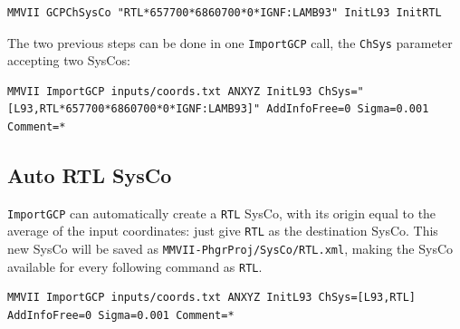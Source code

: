\begin{lstlisting}
MMVII GCPChSysCo "RTL*657700*6860700*0*IGNF:LAMB93" InitL93 InitRTL
\end{lstlisting}


The two previous steps can be done in one \texttt{ImportGCP} call, the \texttt{ChSys} parameter accepting two
SysCos:

\begin{lstlisting}
MMVII ImportGCP inputs/coords.txt ANXYZ InitL93 ChSys="[L93,RTL*657700*6860700*0*IGNF:LAMB93]" AddInfoFree=0 Sigma=0.001 Comment=*
\end{lstlisting}

\subsection{Auto RTL SysCo}

\texttt{ImportGCP} can automatically create a \texttt{RTL} SysCo, with its origin equal to the average of the input coordinates:
just give \texttt{RTL} as the destination SysCo. This new SysCo will be saved as \texttt{MMVII-PhgrProj/SysCo/RTL.xml}, making
the SysCo available for every following command as \texttt{RTL}.

\begin{lstlisting}
MMVII ImportGCP inputs/coords.txt ANXYZ InitL93 ChSys=[L93,RTL] AddInfoFree=0 Sigma=0.001 Comment=*
\end{lstlisting}

